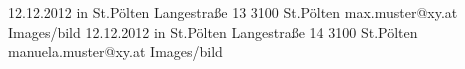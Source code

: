 
\begin{Diplomandenvorstellung}
		  {12.12.2012 in St.P\"olten}
		  {Langestra\ss e 13}
		  {3100 St.Pölten}
		  {
		  }
		  {max.muster@xy.at}
		  {Images/bild}
\newpage	  
		  {12.12.2012 in St.P\"olten}
		  {Langestra\ss e 14}
		  {3100 St.Pölten}
		  {
		   }
		  {manuela.muster@xy.at}
		  {Images/bild}
\end{Diplomandenvorstellung}

